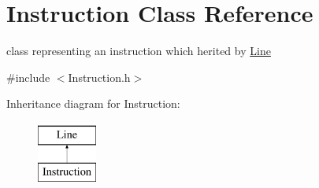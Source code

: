 \hypertarget{class_instruction}{\section{Instruction Class Reference}
\label{class_instruction}
}


class representing an instruction which herited by \hyperlink{class_line}{Line}  




{\ttfamily \#include $<$Instruction.\+h$>$}

Inheritance diagram for Instruction\+:\begin{figure}[H]
\begin{center}
\leavevmode
\includegraphics[height=2.000000cm]{class_instruction}
\end{center}
\end{figure}
